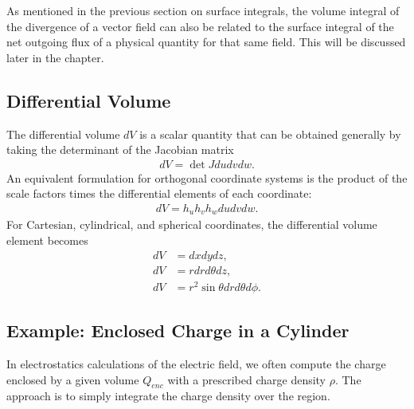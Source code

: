 As mentioned in the previous section on surface integrals, the volume integral of the divergence of a vector field can also be related to the surface integral of the net outgoing flux of a physical quantity for that same field. This will be discussed later in the chapter.


\subsection{Differential Volume}

The differential volume $dV$ is a scalar quantity that can be obtained generally by taking the determinant of the Jacobian matrix
\begin{align}
  dV = \det{ J } du dv dw.
\end{align}
An equivalent formulation for orthogonal coordinate systems is the product of the scale factors times the differential elements of each coordinate:
\begin{align}
  dV = h_u h_v h_w du dv dw.
\end{align}
For Cartesian, cylindrical, and spherical coordinates, the differential volume element becomes
\begin{subequations}
\begin{align}
  dV &= dx dy dz, \\
  dV &= r dr d\theta dz, \\
  dV &= r^2 \sin \theta dr d\theta d\phi .
\end{align}
\end{subequations}


\subsection{Example: Enclosed Charge in a Cylinder}

In electrostatics calculations of the electric field, we often compute the charge enclosed by a given volume $Q_{enc}$ with a prescribed charge density $\rho$. The approach is to simply integrate the charge density over the region.


